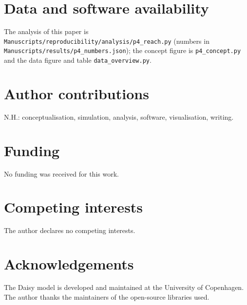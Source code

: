 \section*{Data and software availability}
\suiteavail
\par\smallskip The analysis of this paper is \texttt{Manuscripts/reproducibility/analysis/p4\_reach.py} (numbers in \texttt{Manuscripts/results/p4\_numbers.json}); the concept figure is \texttt{p4\_concept.py} and the data figure and table \texttt{data\_overview.py}.

\section*{Author contributions}
N.H.: conceptualisation, simulation, analysis, software, visualisation, writing.

\section*{Funding}
No funding was received for this work.

\section*{Competing interests}
The author declares no competing interests.

\section*{Acknowledgements}
The Daisy model is developed and maintained at the University of Copenhagen. The author thanks the maintainers of the open-source libraries used.



\appendix

